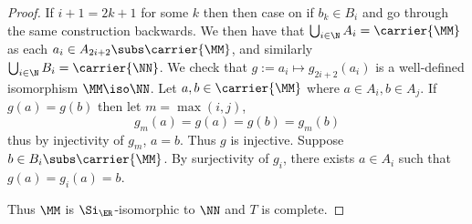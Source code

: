 \begin{proof}
    If $i + 1 = 2k + 1$ for some $k$ then then case on if $b_k \in B_i$
    and go through the same construction backwards.
    We then have that $\bigcup_{i \in \N} A_i = \carrier{\MM}$ as 
    each $a_i \in A_{2i+2} \subs \carrier{\MM}$, 
    and similarly $\bigcup_{i \in \N} B_i = \carrier{\NN}$.
    We check that $g := a_i \mapsto g_{2i+2}(a_i)$ is a well-defined isomorphism
    $\MM \iso \NN$.
    Let $a, b \in \carrier{\MM}$ where $a \in A_i, b \in A_j$.
    If $g(a) = g(b)$ then let $m = \max(i,j)$, 
    \[g_{m}(a) = g(a) = g(b) = g_{m}(b)\]
    thus by injectivity of $g_{m}$, 
    $a = b$. 
    Thus $g$ is injective.
    Suppose $b \in B_i \subs \carrier{\MM}$. 
    By surjectivity of $g_{i}$, there exists $a \in A_i$ such that 
    $g(a) = g_i(a) = b$.

    Thus $\MM$ is $\Si_\ER$-isomorphic to $\NN$ and $T$ is complete.
    
\end{proof} 


